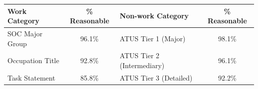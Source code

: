     \begin{tabular}{lc|lc}
        \toprule
        \textbf{Work Category} & \textbf{\% Reasonable} & \textbf{Non-work Category} & \textbf{\% Reasonable} \\
        \midrule
        SOC Major Group & 96.1\% & ATUS Tier 1 (Major) & 98.1\% \\
        Occupation Title & 92.8\% & ATUS Tier 2 (Intermediary) & 96.1\% \\
        Task Statement & 85.8\% & ATUS Tier 3 (Detailed) & 92.2\% \\
        \bottomrule
    \end{tabular}